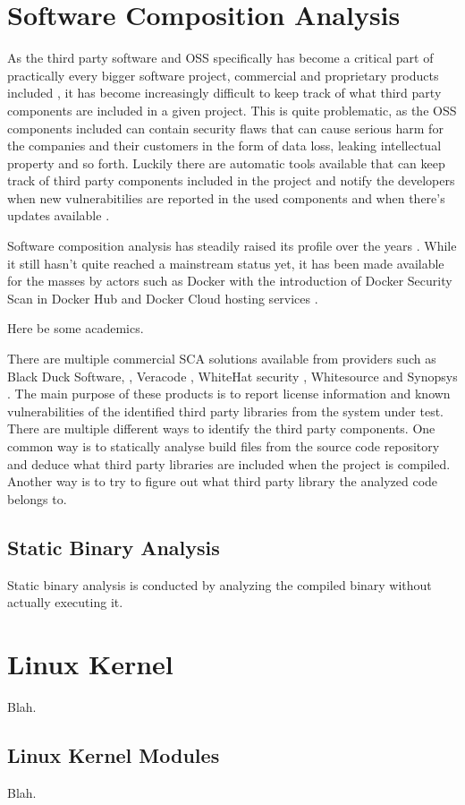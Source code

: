 
\section{Software Composition Analysis}

As the third party software and OSS specifically has become a critical part of practically every
bigger software project, commercial and proprietary products included \cite{blah}, it has become
increasingly difficult to keep track of what third party components are included in a given
project. This is quite problematic, as the OSS components included can contain security flaws that
can cause serious harm for the companies and their customers in the form of data loss, leaking
intellectual property and so forth. Luckily there are automatic tools available that can keep
track of third party components included in the project and notify the developers when new
vulnerabitilies are reported in the used components and when there's updates available
\cite{pittenger2016know}.

Software composition analysis has steadily raised its profile over the years \cite{blah}. While it
still hasn't quite reached a mainstream status yet, it has been made available for the masses by
actors such as Docker with the introduction of Docker Security Scan in Docker Hub and Docker Cloud
hosting services \cite{dockerscan}.

Here be some academics.

There are multiple commercial SCA solutions available from providers such as Black Duck Software,
\cite{blackduckhub}, Veracode \cite{veracodesca}, WhiteHat security \cite{whitehatsentinel},
Whitesource \cite{whitesourceosi} and Synopsys \cite{synopsysprotecode}. The main purpose of these
products is to report license information and known vulnerabilities of the identified third party
libraries from the system under test. There are multiple different ways to identify the third party
components. One common way is to statically analyse build files from the source code repository and
deduce what third party libraries are included when the project is compiled. Another way is to try
to figure out what third party library the analyzed code belongs to.

\subsection{Static Binary Analysis}

Static binary analysis is conducted by analyzing the compiled binary without actually executing it.

\section{Linux Kernel}

Blah.

\subsection{Linux Kernel Modules}

Blah.

